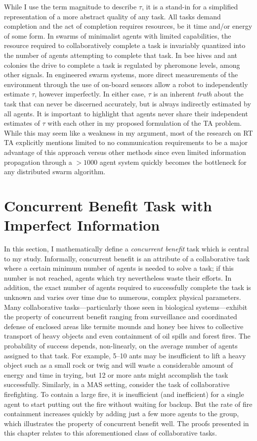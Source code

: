 \documentclass[defaultstyle,12pt]{thesis}
\begin{document}
While I use the term magnitude to describe $\tau$, it is a stand-in for a simplified representation of a more abstract quality of any task. All tasks demand completion and the act of completion requires resources, be it time and/or energy of some form. In swarms of minimalist agents with limited capabilities, the resource required to collaboratively complete a task is invariably quantized into the number of agents attempting to complete that task. In bee hives and ant colonies the drive to complete a task is regulated by pheromone levels, among other signals.  In engineered swarm systems, more direct measurements of the environment through the use of on-board sensors allow a robot to independently estimate $\tau$, however imperfectly. In either case, $\tau$ is an inherent \emph{truth} about the task that can never be discerned accurately, but is always indirectly estimated by all agents. It is important to highlight that agents never share their independent estimates of $\tau$ with each other in my proposed formulation of the TA problem. While this may seem like a weakness in my argument, most of the research on RT TA explicitly mentions limited to no communication requirements to be a major advantage of this approach versus other methods since even limited information propagation through a $>1000$ agent system quickly becomes the bottleneck for any distributed swarm algorithm.

\section{Concurrent Benefit Task with Imperfect Information}\label{sec:conbenefit}
In this section, I mathematically define a \emph{concurrent benefit} task which is central to my study. Informally, concurrent benefit is an attribute of a collaborative task where a certain minimum number of agents is needed to solve a task; if this number is not reached, agents which try nevertheless waste their efforts. In addition, the exact number of agents required to successfully complete the task is unknown and varies over time due to numerous, complex physical parameters. Many collaborative tasks---particularly those seen in biological systems---exhibit the property of concurrent benefit ranging from surveillance and coordinated defense of enclosed areas like termite mounds and honey bee hives \cite{Breed1990} to collective transport of heavy objects and even containment of oil spills and forest fires. The probability of success depends, non-linearly, on the average number of agents assigned to that task. For example, 5--10 ants may be insufficient to lift a heavy object such as a small rock or twig and will waste a considerable amount of energy and time in trying, but 12 or more ants might accomplish the task successfully. Similarly, in a MAS setting, consider the task of collaborative firefighting. To contain a large fire, it is insufficient (and inefficient) for a single agent to start putting out the fire without waiting for backup. But the rate of fire containment increases quickly by adding just a few more agents to the group, which illustrates the property of concurrent benefit well. The proofs presented in this chapter relates to this aforementioned class of collaborative tasks.
\end{document}
